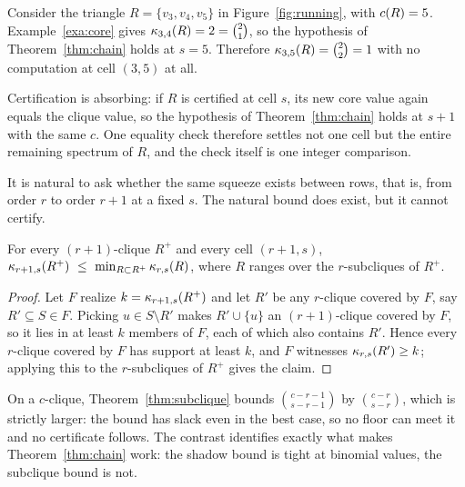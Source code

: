 \begin{example}
\label{exa:chain}
Consider the triangle $R=\{v_3,v_4,v_5\}$ in Figure~\ref{fig:running}, with $c(R)=5$.
%
Example~\ref{exa:core} gives $\kappa_{3,4}(R)=2=\binom{2}{1}$, so the hypothesis of Theorem~\ref{thm:chain} holds at $s=5$.
%
Therefore $\kappa_{3,5}(R)=\binom{2}{2}=1$ with no computation at cell $(3,5)$ at all.
\end{example}

\begin{remark}
Certification is absorbing: if $R$ is certified at cell $s$, its new core value again equals the clique value, so the hypothesis of Theorem~\ref{thm:chain} holds at $s+1$ with the same $c$.
%
One equality check therefore settles not one cell but the entire remaining spectrum of $R$, and the check itself is one integer comparison.
\end{remark}

It is natural to ask whether the same squeeze exists between rows, that is, from order $r$ to order $r{+}1$ at a fixed $s$.
%
The natural bound does exist, but it cannot certify.

\begin{theorem}
\label{thm:subclique}
For every $(r{+}1)$-clique $R^{+}$ and every cell $(r{+}1,s)$,
$\kappa_{r+1,s}(R^{+})\ \le\ \min_{R\subset R^{+}} \kappa_{r,s}(R)$,
where $R$ ranges over the $r$-subcliques of $R^{+}$.
\end{theorem}
\begin{proof}
Let $F$ realize $k=\kappa_{r+1,s}(R^{+})$ and let $R'$ be any $r$-clique covered by $F$, say $R'\subseteq S\in F$.
%
Picking $u\in S\setminus R'$ makes $R'\cup\{u\}$ an $(r{+}1)$-clique covered by $F$, so it lies in at least $k$ members of $F$, each of which also contains $R'$.
%
Hence every $r$-clique covered by $F$ has support at least $k$, and $F$ witnesses $\kappa_{r,s}(R')\ge k$; applying this to the $r$-subcliques of $R^{+}$ gives the claim.
\end{proof}

\begin{remark}
On a $c$-clique, Theorem~\ref{thm:subclique} bounds $\binom{c-r-1}{s-r-1}$ by $\binom{c-r}{s-r}$, which is strictly larger: the bound has slack even in the best case, so no floor can meet it and no certificate follows.
%
The contrast identifies exactly what makes Theorem~\ref{thm:chain} work: the shadow bound is tight at binomial values, the subclique bound is not.
\end{remark}

